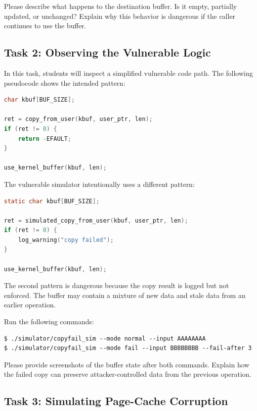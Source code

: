 Please describe what happens to the destination buffer. Is it empty, partially
updated, or unchanged? Explain why this behavior is dangerous if the caller
continues to use the buffer.


\subsection{Task 2: Observing the Vulnerable Logic}

In this task, students will inspect a simplified vulnerable code path. The
following pseudocode shows the intended pattern:

\begin{lstlisting}[language=C]
char kbuf[BUF_SIZE];

ret = copy_from_user(kbuf, user_ptr, len);
if (ret != 0) {
    return -EFAULT;
}

use_kernel_buffer(kbuf, len);
\end{lstlisting}

The vulnerable simulator intentionally uses a different pattern:

\begin{lstlisting}[language=C]
static char kbuf[BUF_SIZE];

ret = simulated_copy_from_user(kbuf, user_ptr, len);
if (ret != 0) {
    log_warning("copy failed");
}

use_kernel_buffer(kbuf, len);
\end{lstlisting}

The second pattern is dangerous because the copy result is logged but not
enforced. The buffer may contain a mixture of new data and stale data from an
earlier operation.

Run the following commands:

\begin{lstlisting}
$ ./simulator/copyfail_sim --mode normal --input AAAAAAAA
$ ./simulator/copyfail_sim --mode fail --input BBBBBBBB --fail-after 3
\end{lstlisting}

Please provide screenshots of the buffer state after both commands. Explain how
the failed copy can preserve attacker-controlled data from the previous
operation.


\subsection{Task 3: Simulating Page-Cache Corruption}

